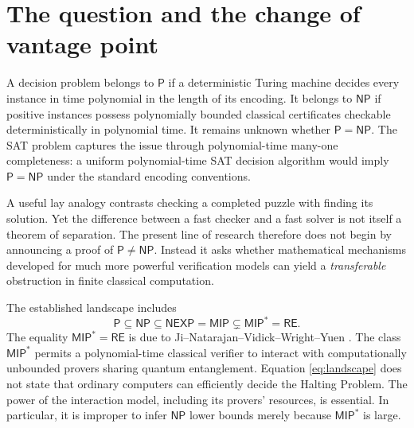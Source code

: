 \documentclass[11pt,a4paper]{article}
\newcommand{\Pclass}{\mathsf{P}}
\newcommand{\NPclass}{\mathsf{NP}}
\newcommand{\RE}{\mathsf{RE}}
\newcommand{\MIP}{\mathsf{MIP}}
\newcommand{\NEXP}{\mathsf{NEXP}}
\begin{document}
\section{The question and the change of vantage point}
A decision problem belongs to $\Pclass$ if a deterministic Turing machine decides every instance in time polynomial in the length of its encoding. It belongs to $\NPclass$ if positive instances possess polynomially bounded classical certificates checkable deterministically in polynomial time. It remains unknown whether $\Pclass=\NPclass$. The SAT problem captures the issue through polynomial-time many-one completeness: a uniform polynomial-time SAT decision algorithm would imply $\Pclass=\NPclass$ under the standard encoding conventions.

A useful lay analogy contrasts checking a completed puzzle with finding its solution. Yet the difference between a fast checker and a fast solver is not itself a theorem of separation. The present line of research therefore does not begin by announcing a proof of $\Pclass\ne\NPclass$. Instead it asks whether mathematical mechanisms developed for much more powerful verification models can yield a \emph{transferable} obstruction in finite classical computation.

The established landscape includes
\begin{equation}\label{eq:landscape}
\Pclass\subseteq\NPclass\subseteq\NEXP=\MIP\subsetneq\MIP^*=\RE.
\end{equation}
The equality $\MIP^*=\RE$ is due to Ji--Natarajan--Vidick--Wright--Yuen \cite{jnvwy}. The class $\MIP^*$ permits a polynomial-time classical verifier to interact with computationally unbounded provers sharing quantum entanglement. Equation \eqref{eq:landscape} does not state that ordinary computers can efficiently decide the Halting Problem. The power of the interaction model, including its provers' resources, is essential. In particular, it is improper to infer $\NPclass$ lower bounds merely because $\MIP^*$ is large.
\end{document}
